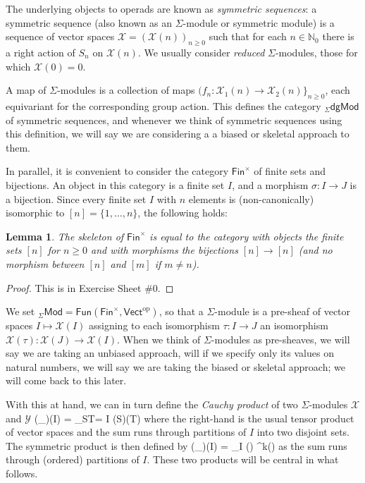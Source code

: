 \documentclass[fleqn,a4paper, twoside]{article}
\makeatletter
\newcommand{\0}{\langle 0\rangle}
\newcommand{\XX}{\mathcal{X}}
\newcommand{\YY}{\mathcal{Y}}
\let\[\@undefined
\DeclareRobustCommand{\[}{\begin{equation}}%
\let\]\@undefined
\DeclareRobustCommand{\]}{\end{equation}}%
\theoremstyle{mytheorem}
\newtheorem{lemma}[theorem]{Lemma}
\theoremstyle{introthm}
\theoremstyle{mydefinition}
\theoremstyle{mydefinition2}
\theoremstyle{plain} %
\newcommand{\GSet}{\mathsf{Fin}^\times}
\newcommand{\Fun}{\mathsf{Fun}}
\newcommand{\Mod}{\mathsf{Mod}}
\newcommand{\SMod}{{}_\Sigma\mathsf{dgMod}}
\newcommand{\?}{\,?\,}
\newcommand{\NN}{\mathbb N}
\theoremstyle{mytheorem}
\theoremstyle{plain} %
\makeatother
\begin{document}
The underlying objects to operads are known as
\emph{symmetric sequences}: a symmetric sequence
(also known as an $\Sigma$-module or symmetric 
module) is a sequence of vector spaces
$\XX = (\XX(n))_{n\geqslant 0}$ such that for
each $n\in\NN_0$ there is a right action of
$S_n$ on $\XX(n)$. We usually consider \emph{reduced}
$\Sigma$-modules, those for which $\XX(0)=0$.

A map of $\Sigma$-modules is a collection of maps
$(f_n : \XX_1(n) \longrightarrow \XX_2(n)\}_{n\geqslant 0}$,
each equivariant for the corresponding group action. 
This defines the category $\SMod$ of symmetric
sequences, and whenever we think of symmetric sequences
using this definition, we will say we are considering a 
a biased or skeletal approach to them.

In parallel, it is convenient to consider the 
category $\GSet$ of finite sets and bijections.
An object in this category is a finite set $I$,
and a morphism $\sigma : I\longrightarrow J$ is a
bijection. Since every finite set $I$ with $n$
elements is (non-canonically) isomorphic to 
$[n] =\{1,\ldots,n\}$, the following holds:

\begin{lemma} The skeleton of $\GSet$ is
equal to the category with objects the finite sets
$[n]$ for $n\geqslant 0$ and with morphisms the
bijections $[n]\longrightarrow [n]$ (and no morphism
between $[n]$ and $[m]$ if $m\neq n$).
\end{lemma}

\begin{proof}
This is in Exercise Sheet \#0. 
\end{proof}

We set ${}_\Sigma\Mod  = 
\Fun(\GSet,\mathsf{Vect}^{\mathrm{op}})$,
so that a $\Sigma$-module is a pre-sheaf of vector
spaces $I\longmapsto \XX(I)$ assigning to each
isomorphism $\tau : I\longrightarrow J$ an isomorphism
$\XX(\tau): \XX(J)\longrightarrow \XX(I)$. When we
think of $\Sigma$-modules as pre-sheaves, we will say we 
are taking an unbiased approach, will if we specify only
its values on natural numbers, we will say we are taking the
biased or skeletal approach; we will come back to this later.

With this at hand, 
we can in turn define the \emph{Cauchy product}
of two $\Sigma$-modules $\XX$ and $\YY$
\[ (\XX\otimes_\Sigma \YY)(I) = 
 	\bigoplus_{S\sqcup T= I}
 		 \XX(S)\otimes \YY(T)\] 
where the right-hand is the usual tensor product of
vector spaces
and the sum runs through partitions of $I$ into
two disjoint sets. The symmetric product is then
defined by 
\[ (\XX\circ_\Sigma \YY)(I) 
 	= \bigoplus_{\pi \vdash I} \XX(\pi) 
 		\otimes \YY^{\otimes k}(\pi)\] 
as the sum runs through (ordered) partitions of $I$.
These two products will be central in what follows.
\end{document}
